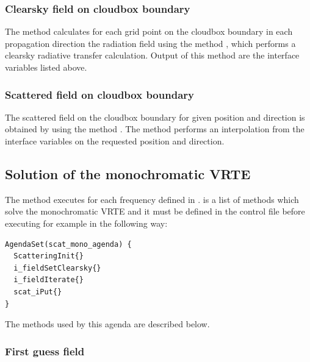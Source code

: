 \subsubsection{Clearsky field on cloudbox boundary} The method
 calculates for each grid point on the
cloudbox boundary in each propagation direction the radiation field
using the method , which performs a clearsky
radiative transfer calculation.  Output of this method are the
interface variables listed above.

\subsubsection{Scattered field on cloudbox boundary} The scattered field on
the cloudbox boundary for given position and direction is obtained by
using the method . The method performs
an interpolation from the interface variables on the requested
position and direction.


\subsection{Solution of the monochromatic VRTE}
\label{sec:scattering:scat_mono_ag}

The method  executes
 for each frequency defined in
.  is a list of methods which solve the
monochromatic VRTE and it must be defined in the control file before
executing  for example in the following way:

\begin{verbatim}
AgendaSet(scat_mono_agenda) {
  ScatteringInit{}
  i_fieldSetClearsky{}
  i_fieldIterate{}
  scat_iPut{}
}
\end{verbatim}

\noindent
The methods used by this agenda are described below.

 
\subsubsection{First guess field}


